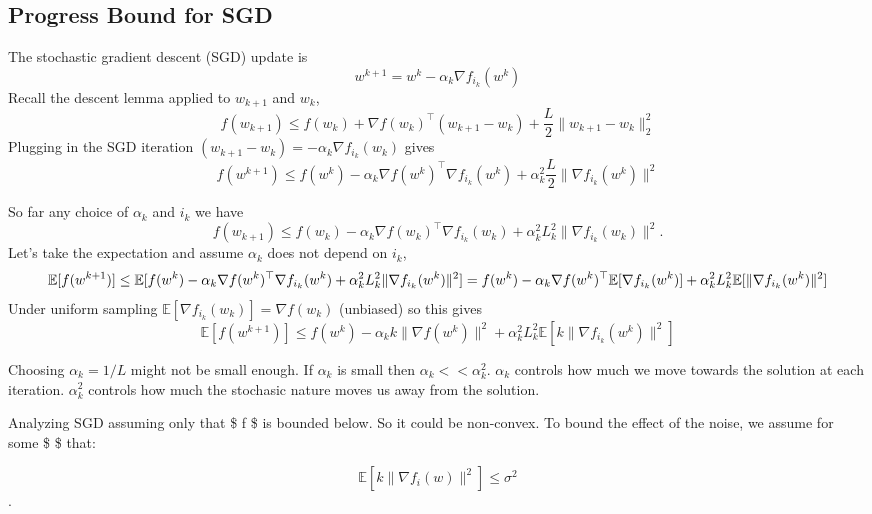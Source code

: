 \documentclass[
]{article}
\begin{document}
\subsection{Progress Bound for SGD}\label{progress-bound-for-sgd}

The stochastic gradient descent (SGD) update is
\[ w^{k+1} = w^k - \alpha_k \nabla f_{i_k}(w^k) \]
Recall the descent lemma applied to \(w_{k+1}\) and \(w_k\),
\[ f(w_{k+1}) \leq f(w_k) + \nabla f(w_k)^\top (w_{k+1} - w_k) + \frac{L}{2} \| w_{k+1} - w_k \|_2^2\]
Plugging in the SGD iteration \((w_{k+1} - w_k) = -\alpha_k \nabla f_{i_k}(w_k)\) gives
\[f(w^{k+1}) \leq f(w^k) - \alpha_k \nabla f(w^k)^\top \nabla f_{i_k}(w^k) + \alpha_k^2 \frac{ L}{2} \|\nabla f_{i_k}(w^k)\|^2 \]

So far any choice of \(\alpha_k\) and \(i_k\) we have
\[
f(w_{k+1}) \leq f(w_k) - \alpha_k \nabla f(w_k)^\top \nabla f_{i_k}(w_k) + \alpha_k^2 L_k^2 \|\nabla f_{i_k}(w_k)\|^2.
\]
Let's take the expectation and assume \(\alpha_k\) does not depend on \(i_k\),
\[
\mathbb{E}[f(w^{k+1})] \leq \mathbb{E}[f(w^k) - \alpha_k \nabla f(w^k)^\top \nabla f_{i_k}(w^k) + \alpha_k^2 L_k^2 \|\nabla f_{i_k}(w^k)\|^2] \\ = f(w^k) - \alpha_k \nabla f(w^k)^\top \mathbb{E}[\nabla f_{i_k}(w^k)] + \alpha_k^2 L_k^2 \mathbb{E}[\|\nabla f_{i_k}(w^k)\|^2]
\]
Under uniform sampling \(\mathbb{E}[\nabla f_{i_k}(w_k)] = \nabla f(w_k)\) (unbiased) so this gives
\[
\mathbb{E}[f(w^{k+1})] \leq f(w^k) - \alpha_k k \|\nabla f(w^k)\|^2 + \alpha_k^2 L_k^2 \mathbb{E}[k\|\nabla f_{i_k}(w^k)\|^2]
\]

Choosing \(\alpha_k = 1/L\) might not be small enough. If \(\alpha_k\) is small then \(\alpha_k << \alpha_k^2\). \(\alpha_k\) controls how much we move towards the solution at each iteration. \(\alpha_k^2\) controls how much the stochasic nature moves us away from the solution.

Analyzing SGD assuming only that \$ f \$ is bounded below. So it could be non-convex. To bound the effect of the noise, we assume for some \$ \sigma \$ that:

\[ \mathbb{E}[k\|\nabla f_i(w)\|^2] \leq \sigma^2 \].
\end{document}
